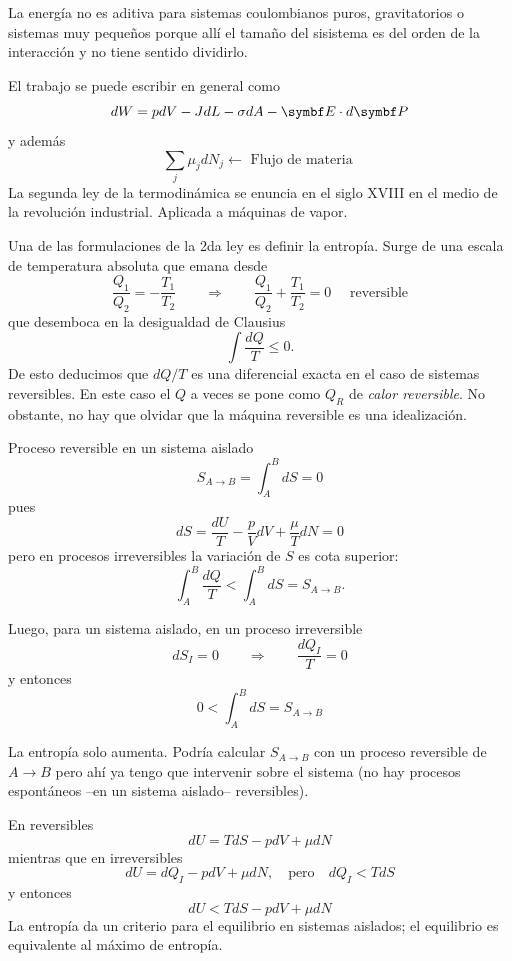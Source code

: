 \documentclass[10pt,oneside]{CBFT_book}
\begin{document}
La energía no es aditiva para sistemas coulombianos puros, gravitatorios o sistemas muy pequeños
porque allí el tamaño del sisistema es del orden de la interacción y no tiene sentido dividirlo.

El trabajo se puede escribir en general como
\[
	dW = p dV - J dL - \sigma dA - \vb{E}\cdot d\vb{P}
\]
y además
\[
	\sum_{j} \mu_j dN_j \leftarrow \text{ Flujo de materia }
\]
La segunda ley de la termodinámica se enuncia en el siglo XVIII en el medio de la revolución industrial.
Aplicada a máquinas de vapor.

Una de las formulaciones de la 2da ley es definir la entropía. 
Surge de una escala de temperatura absoluta que emana desde
\[
	\frac{Q_1}{Q_2} = -\frac{T_1}{T_2} 
	\qquad \Rightarrow \qquad 
	\frac{Q_1}{Q_2} + \frac{T_1}{T_2} = 0 \quad
	\text{ reversible}
\]
que desemboca en la desigualdad de Clausius
\[
	\int \frac{dQ}{T} \leq 0.
\] 
De esto deducimos que $dQ/T$ es una diferencial exacta en el caso de sistemas reversibles.
En este caso el $Q$ a veces se pone como $Q_R$ de {\it calor reversible}.
No obstante, no hay que olvidar que la máquina reversible es una idealización.


Proceso reversible en un sistema aislado
\[
	S_{A\to B} = \int_A^B dS = 0
\]
pues 
\[
	dS =\frac{dU}{T} - \frac{p}{V}dV + \frac{\mu}{T}dN = 0
\]
pero en procesos irreversibles la variación de $S$ es cota superior:
\[
	\int_A^B \frac{dQ}{T} < \int_A^B dS = S_{A\to B}.
\]

Luego, para un sistema aislado, en un proceso irreversible 
\[
	dS_I = 0 \qquad \Rightarrow \qquad \frac{dQ_I}{T} = 0
\]
y entonces
\[
	0 < \int_A^B  dS =  S_{A\to B}
\]

La entropía solo aumenta. Podría calcular $S_{A\to B}$ con un proceso reversible de $A\to B$ pero ahí 
ya tengo que intervenir sobre el sistema (no hay procesos espontáneos --en un sistema aislado-- reversibles).

En reversibles
\[
	dU = TdS - pdV + \mu dN
\]
mientras que en irreversibles
\[
	dU = dQ_I - pdV +\mu dN, \quad \text{pero} \quad dQ_I < TdS 
\]
y entonces
\[
	dU < TdS - pdV + \mu dN
\]
La entropía da un criterio para el equilibrio en sistemas aislados; el equilibrio es
equivalente al máximo de entropía.
\end{document}
